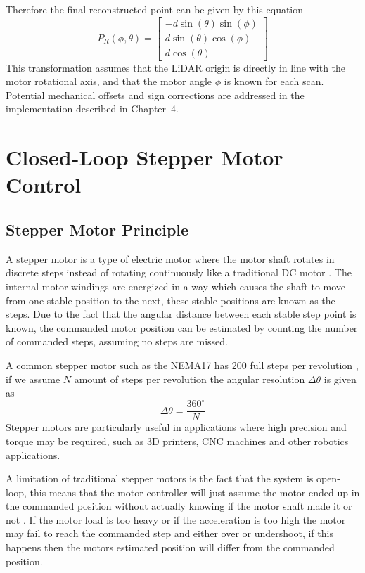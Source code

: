 Therefore the final reconstructed point can be given by this equation
\begin{equation}
    P_R(\phi, \theta) = 
    \begin{bmatrix}
        -d\sin(\theta) \sin(\phi) \\
        d\sin(\theta) \cos(\phi) \\
        d\cos(\theta)
    \end{bmatrix}
\end{equation}
This transformation assumes that the LiDAR origin is directly in line with the motor rotational axis, and that the motor angle \(\phi\) is known for each scan. Potential mechanical offsets and sign corrections are addressed in the implementation described in Chapter~4.

\newpage
\section{Closed-Loop Stepper Motor Control}
\subsection{Stepper Motor Principle}
A stepper motor is a type of electric motor where the motor shaft rotates in discrete steps instead of rotating continuously like a traditional DC motor \cite{StepperBasics}.
The internal motor windings are energized in a way which causes the shaft to move from one stable position to the next, these stable positions are known as the steps. 
Due to the fact that the angular distance between each stable step point is known, the commanded motor position can be estimated by counting the number of commanded steps, assuming no steps are missed.

A common stepper motor such as the NEMA17 has 200 full steps per revolution \cite{NEMA17Datasheet}, if we assume \(N\) amount of steps per revolution the angular resolution \(\Delta \theta\) is given as
\begin{equation}
    \Delta \theta = \frac{360^\circ}{N}
\end{equation}
Stepper motors are particularly useful in applications where high precision and torque may be required, such as 3D printers, CNC machines and other robotics applications.

A limitation of traditional stepper motors is the fact that the system is open-loop, this means that the motor controller will just assume the motor ended up in the commanded position without actually knowing if the motor shaft made it or not \cite{StepperBasics}.
If the motor load is too heavy or if the acceleration is too high the motor may fail to reach the commanded step and either over or undershoot, if this happens then the motors estimated position will differ from the commanded position.

